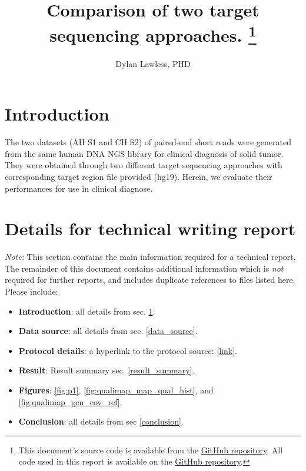 \documentclass{article}
\begin{document}
\date{} %
\title{\Large \bf Comparison of two target sequencing approaches.
\footnote{This document's source code is available from the 
\href{https://github.com/DylanLawless/kit_assess/blob/master/latex/report.tex}{GitHub repository}.
All code used in this report is available on the 
\href{https://github.com/DylanLawless/kit_assess}{GitHub repository}.}
}

\author[1]{\rm Dylan Lawless, PHD}
\maketitle


\section{Introduction}
\label{intro}
The two datasets (AH S1 and CH S2) of paired-end short reads were generated from the same human DNA NGS library for clinical diagnosis of solid tumor. 
They were obtained through two different target sequencing approaches with corresponding target region file provided (hg19). 
Herein, we evaluate their performances for use in clinical diagnose.

\section{Details for technical writing report}
\textit{Note:}
This section contains the main information required for a technical report.
The remainder of this document contains additional information which is \textit{not} required for further reports, and includes duplicate references to files listed here.
Please include:

\begin{itemize}
\item \textbf{Introduction}: all details from sec. \ref{intro}.
\item \textbf{Data source}: all details from sec. \ref{data_source}.
\item \textbf{Protocol details}: a hyperlink to the protocol source: [\href{https://github.com/DylanLawless/kit_assess/README.md}{link}].
\item \textbf{Result}: Result summary sec. \ref{result_summary}.
\item \textbf{Figures}: \ref{fig:p1}, \ref{fig:qualimap_map_qual_hist},  and \ref{fig:qualimap_gen_cov_ref}.
\item \textbf{Conclusion}: all details from sec \ref{conclusion}.
\end{itemize}
\end{document}
